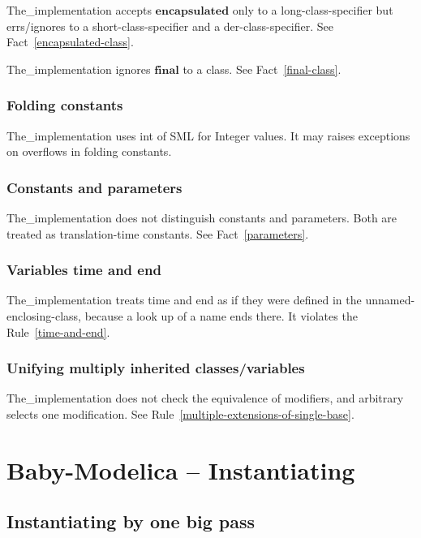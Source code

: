 \documentclass[10pt,b5paper]{article}
\begin{document}
The_implementation accepts $\mathbf{encapsulated}$ only to a
long-class-specifier but errs/ignores to a short-class-specifier and a
der-class-specifier.  See Fact~\ref{encapsulated-class}.

The_implementation ignores $\mathbf{final}$ to a class.  See
Fact~\ref{final-class}.

\subsubsection*{Folding constants}

The_implementation uses int of SML for Integer values.  It may raises
exceptions on overflows in folding constants.

\subsubsection*{Constants and parameters}

The_implementation does not distinguish constants and parameters.
Both are treated as translation-time constants.  See
Fact~\ref{parameters}.

\subsubsection*{Variables {time} and {end}}

The_implementation treats {time} and {end} as if they were defined in
the unnamed-enclosing-class, because a look up of a name ends there.
It violates the Rule~\ref{time-and-end}.

\subsubsection*{Unifying multiply inherited classes/variables}

The_implementation does not check the equivalence of modifiers, and
arbitrary selects one modification.  See
Rule~\ref{multiple-extensions-of-single-base}.


\section{Baby-Modelica -- Instantiating}


\subsection{Instantiating by one big pass}
\end{document}
